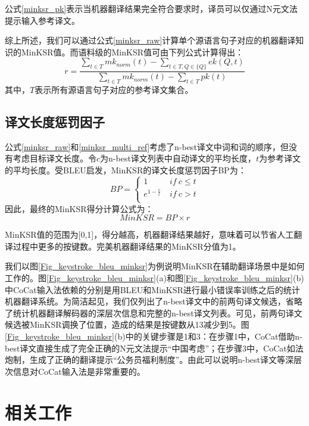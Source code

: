 公式\ref{minksr_pk}表示当机器翻译结果完全符合要求时，译员可以仅通过N元文法提示输入参考译文。

综上所述，我们可以通过公式\ref{minksr_raw}计算单个源语言句子对应的机器翻译知识的MinKSR值。而语料级的MinKSR值可由下列公式计算得出：
\begin{equation}
\label{minksr_multi_ref}
r = \frac{\sum_{t\in T}mk_{norm}(t)-\sum_{t\in T,Q\in \{Q\}}ek(Q,t)}
{\sum_{t\in T}mk_{norm}(t)-\sum_{t\in T}pk(t)}
\end{equation}
其中，$T$表示所有源语言句子对应的参考译文集合。

\subsection{译文长度惩罚因子}

公式\ref{minksr_raw}和\ref{minksr_multi_ref}考虑了n-best译文中词和词的顺序，但没有考虑目标译文长度。令$c$为n-best译文列表中自动译文的平均长度，$t$为参考译文的平均长度。受BLEU启发，MinKSR的译文长度惩罚因子BP为：
\begin{equation}
BP= \left \{ 
\begin{array}{ll}
1 \ & if \ c \le t \\
e^{1-\frac{c}{t}} \ & if \ c>t \\
\end{array}
\right.
\end{equation}
因此，最终的MinKSR得分计算公式为：
\begin{equation}
MinKSR=BP \times r
\end{equation}

MinKSR值的范围为[0,1]，得分越高，机器翻译结果越好，意味着可以节省人工翻译过程中更多的按键数。完美机器翻译结果的MinKSR分值为1。

我们以图\ref{Fig_keystroke_bleu_minksr}为例说明MinKSR在辅助翻译场景中是如何工作的。图\ref{Fig_keystroke_bleu_minksr}(a)和图\ref{Fig_keystroke_bleu_minksr}(b)中CoCat输入法依赖的分别是用BLEU和MinKSR进行最小错误率训练之后的统计机器翻译系统。为简洁起见，我们仅列出了n-best译文中的前两句译文候选，省略了统计机器翻译解码器的深层次信息和完整的n-best译文列表。可见，前两句译文候选被MinKSR调换了位置，造成的结果是按键数从13减少到5。图\ref{Fig_keystroke_bleu_minksr}(b)中的关键步骤是1和3：在步骤1中，CoCat借助n-best译文直接生成了完全正确的N元文法提示“中国考虑”；在步骤3中，CoCat如法炮制，生成了正确的翻译提示“公务员福利制度”。由此可以说明n-best译文等深层次信息对CoCat输入法是非常重要的。

\section{相关工作}

